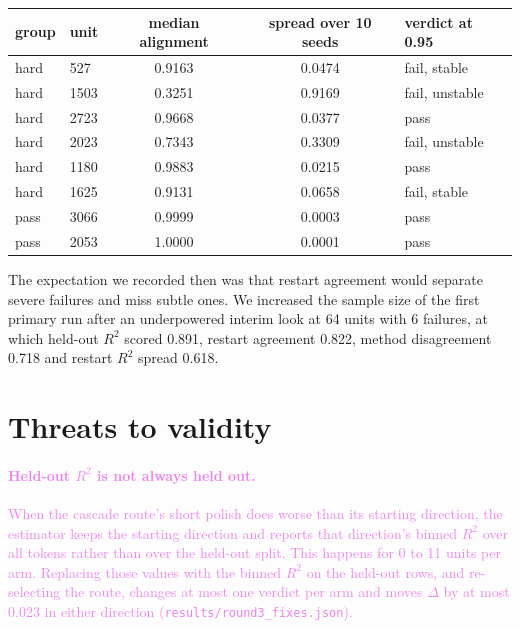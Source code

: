 \documentclass[10pt]{article}
\newcommand{\draft}[1]{\textcolor{violet}{#1}}
\begin{document}
\begin{center}
\scriptsize
\begin{tabular}{llccl}
\toprule
group & unit & median alignment & spread over 10 seeds & verdict at 0.95 \\
\midrule
hard & 527 & 0.9163 & 0.0474 & fail, stable \\
hard & 1503 & 0.3251 & 0.9169 & fail, unstable \\
hard & 2723 & 0.9668 & 0.0377 & pass \\
hard & 2023 & 0.7343 & 0.3309 & fail, unstable \\
hard & 1180 & 0.9883 & 0.0215 & pass \\
hard & 1625 & 0.9131 & 0.0658 & fail, stable \\
pass & 3066 & 0.9999 & 0.0003 & pass \\
pass & 2053 & 1.0000 & 0.0001 & pass \\
\bottomrule
\end{tabular}
\end{center}

\noindent The expectation we recorded then was that restart agreement would separate severe
failures and miss subtle ones. We increased the sample size of the first primary run after an
underpowered interim look at 64 units with 6 failures, at which held-out $R^2$ scored 0.891,
restart agreement 0.822, method disagreement 0.718 and restart $R^2$ spread 0.618.

\FloatBarrier
\section{Threats to validity}
\label{app:threats}
\draft{\paragraph{Held-out $R^2$ is not always held out.} When the cascade route's short polish
does worse than its starting direction, the estimator keeps the starting direction and reports
that direction's binned $R^2$ over all tokens rather than over the held-out split. This happens
for 0 to 11 units per arm. Replacing those values with the binned $R^2$ on the held-out rows,
and re-selecting the route, changes at most one verdict per arm and moves $\Delta$ by at most
0.023 in either direction
(\texttt{results/round3\_fixes.json}).}
\end{document}
